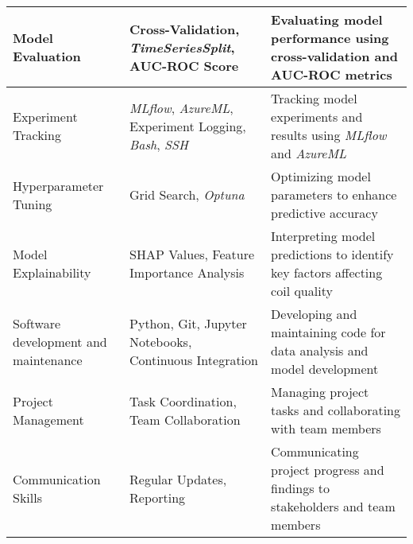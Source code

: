 \begin{table}[ht]
\begin{tabular}{|>{\raggedright}m{3cm}|>{\raggedright}m{5cm}|>{\raggedright\arraybackslash}m{7cm}|}
        \hline
        Model Evaluation                     & Cross-Validation, \emph{TimeSeriesSplit}, AUC-ROC Score                               & Evaluating model performance using cross-validation and AUC-ROC metrics             \\
        \hline
        Experiment Tracking                  & \emph{MLflow}, \emph{AzureML}, Experiment Logging, \emph{Bash}, \emph{SSH}            & Tracking model experiments and results using \emph{MLflow} and \emph{AzureML}       \\
        \hline
        Hyperparameter Tuning                & Grid Search, \emph{Optuna}                                                            & Optimizing model parameters to enhance predictive accuracy                          \\
        \hline
        Model Explainability                 & SHAP Values, Feature Importance Analysis                                              & Interpreting model predictions to identify key factors affecting coil quality       \\
        \hline
        Software development and maintenance & Python, Git, Jupyter Notebooks, Continuous Integration                                & Developing and maintaining code for data analysis and model development             \\
        \hline
        Project Management                   & Task Coordination, Team Collaboration                                                 & Managing project tasks and collaborating with team members                          \\
        \hline
        Communication Skills                 & Regular Updates, Reporting                                                            & Communicating project progress and findings to stakeholders and team members        \\
        \hline
    \end{tabular}
\end{table}
